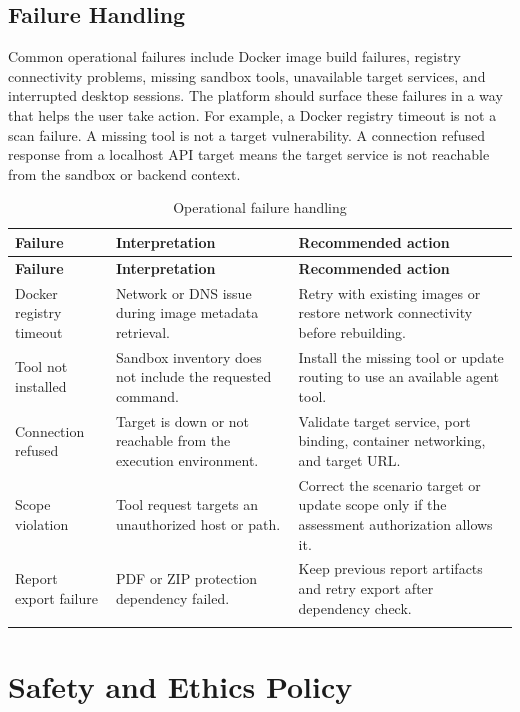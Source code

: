 \documentclass[12pt,a4paper]{report}
\begin{document}
\subsection*{Failure Handling}

Common operational failures include Docker image build failures, registry connectivity
problems, missing sandbox tools, unavailable target services, and interrupted desktop
sessions. The platform should surface these failures in a way that helps the user take
action. For example, a Docker registry timeout is not a scan failure. A missing tool is
not a target vulnerability. A connection refused response from a localhost API target
means the target service is not reachable from the sandbox or backend context.

\begin{longtable}{|p{}|p{}|p{}|}
\hline
\textbf{Failure} & \textbf{Interpretation} & \textbf{Recommended action} \\
\hline
\endfirsthead
\hline
\textbf{Failure} & \textbf{Interpretation} & \textbf{Recommended action} \\
\hline
\endhead
Docker registry timeout & Network or DNS issue during image metadata retrieval. &
Retry with existing images or restore network connectivity before rebuilding. \\
\hline
Tool not installed & Sandbox inventory does not include the requested command. &
Install the missing tool or update routing to use an available agent tool. \\
\hline
Connection refused & Target is down or not reachable from the execution environment. &
Validate target service, port binding, container networking, and target URL. \\
\hline
Scope violation & Tool request targets an unauthorized host or path. & Correct the
scenario target or update scope only if the assessment authorization allows it. \\
\hline
Report export failure & PDF or ZIP protection dependency failed. & Keep previous report
artifacts and retry export after dependency check. \\
\hline
\caption{Operational failure handling}
\label{tab:failure_handling}
\end{longtable}

\newpage
\section{Safety and Ethics Policy}
\end{document}
